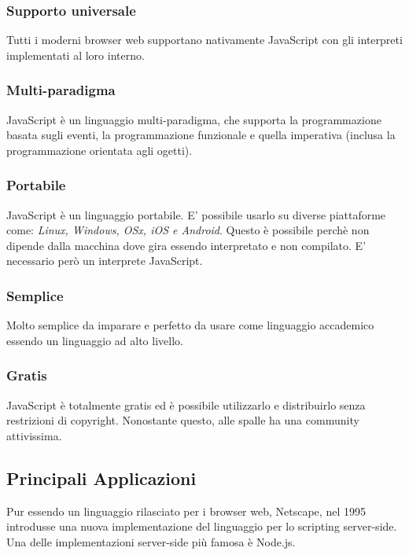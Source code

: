             \subsubsection{Supporto universale}
                Tutti i moderni browser web supportano nativamente JavaScript con gli interpreti implementati al loro interno.
            
            \subsubsection{Multi-paradigma}
                JavaScript è un linguaggio multi-paradigma, che supporta la programmazione basata sugli eventi, la programmazione funzionale e quella imperativa (inclusa la programmazione orientata agli ogetti).

            \subsubsection{Portabile}
                JavaScript è un linguaggio portabile. E' possibile usarlo su diverse piattaforme come: \textit{Linux, Windows, OSx, iOS e Android}. Questo è possibile perchè non dipende dalla macchina dove gira essendo interpretato e non compilato. E' necessario però un interprete JavaScript.

            \subsubsection{Semplice}
                Molto semplice da imparare e perfetto da usare come linguaggio accademico essendo un linguaggio ad alto livello.

            \subsubsection{Gratis}
                JavaScript è totalmente gratis ed è possibile utilizzarlo e distribuirlo senza restrizioni di copyright. Nonostante questo, alle spalle ha una community attivissima.

        \subsection{Principali Applicazioni}
            Pur essendo un linguaggio rilasciato per i browser web, Netscape, nel 1995 introdusse una nuova implementazione del linguaggio per lo scripting server-side. Una delle implementazioni server-side più famosa è Node.js.

